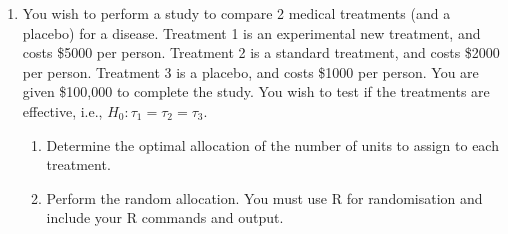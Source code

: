 \documentclass[a4paper]{article}
\newcommand{\0}{\mathbf{0}}
\begin{document}
\begin{enumerate}
\item You wish to perform a study to compare 2 medical treatments (and a placebo) for a disease. Treatment 1 is an experimental new treatment, and costs \$5000 per person. Treatment 2 is a standard treatment, and costs \$2000 per person. Treatment 3 is a placebo, and costs \$1000 per person. You are given \$100,000 to complete the study. You wish to test if the treatments are effective, i.e., $H_0: \tau_1 = \tau_2 = \tau_3$.

	\begin{enumerate}
		\item Determine the optimal allocation of the number of units to assign to each treatment.
		\item Perform the random allocation. You must use R for randomisation and include your R commands and output.
	\end{enumerate}

\end{enumerate}
\end{document}
